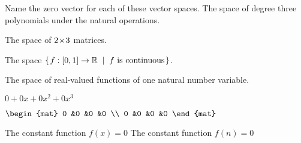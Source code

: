 

\begin{Exercise}[
name={},
title={}, 
difficulty=0,
origin={\cite{JH}}]
Name the zero vector for each of these vector spaces.
\Question
The space of degree three polynomials under the natural operations.

\Question
The space of \( 2 \! \times \! 3 \) matrices.

\Question
The space \( \mbox{$\left\{\hspace{0.1em}f:[0,1]\to\mathbb{R}\;\;\middle|\;\; f\text{ is continuous}\hspace{0.1em}\right\}$} \).

\Question
The space of real-valued functions of one natural number variable.

\end{Exercise}

\begin{Answer}
\Question \( 0+0x+0x^2+0x^3 \)

\Question \( \begin{mat}
                   0  &0  &0  &0  \\
                   0  &0  &0  &0
                 \end{mat} \)

\Question The constant function \( f(x)=0 \)
\Question The constant function \( f(n)=0 \)
\end{Answer}
